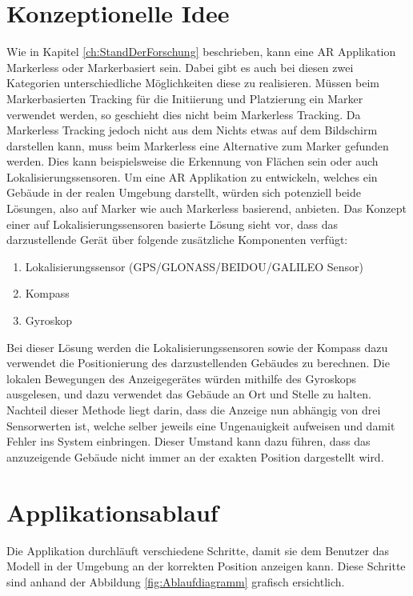 \documentclass[a4paper]{scrreprt}
\begin{document}
\section{Konzeptionelle Idee}
Wie in Kapitel \ref{ch:StandDerForschung} beschrieben, kann eine AR Applikation Markerless oder Markerbasiert sein. Dabei gibt es auch bei diesen zwei Kategorien unterschiedliche Möglichkeiten diese zu realisieren. Müssen beim Markerbasierten Tracking für die Initiierung und Platzierung ein Marker verwendet werden, so geschieht dies nicht beim Markerless Tracking. Da Markerless Tracking jedoch nicht aus dem Nichts etwas auf dem Bildschirm darstellen kann, muss beim Markerless eine Alternative zum Marker gefunden werden. Dies kann beispielsweise die Erkennung von Flächen sein \parencite{GoogleARCore2018} oder auch Lokalisierungssensoren.
Um eine AR Applikation zu entwickeln, welches ein Gebäude in der realen Umgebung darstellt, würden sich potenziell beide Lösungen, also auf Marker wie auch Markerless basierend, anbieten.
\bigbreak
Das Konzept einer auf Lokalisierungssensoren basierte Lösung sieht vor, dass das darzustellende Gerät über folgende zusätzliche Komponenten verfügt: 
\begin{enumerate}
	\item Lokalisierungssensor (GPS/GLONASS/BEIDOU/GALILEO Sensor)
	\item Kompass
	\item Gyroskop
\end{enumerate}

Bei dieser Lösung werden die Lokalisierungssensoren sowie der Kompass dazu verwendet die Positionierung des darzustellenden Gebäudes zu berechnen. Die lokalen Bewegungen des Anzeigegerätes würden mithilfe des Gyroskops ausgelesen, und dazu verwendet das Gebäude an Ort und Stelle zu halten.
Nachteil dieser Methode liegt darin, dass die Anzeige nun abhängig von drei Sensorwerten ist, welche selber jeweils eine Ungenauigkeit aufweisen und damit Fehler ins System einbringen. Dieser Umstand kann dazu führen, dass das anzuzeigende Gebäude nicht immer an der exakten Position dargestellt wird.

\section{Applikationsablauf}
Die Applikation durchläuft verschiedene Schritte, damit sie dem Benutzer das Modell in der Umgebung an der korrekten Position anzeigen kann. Diese Schritte sind anhand der Abbildung  \ref{fig:Ablaufdiagramm} grafisch ersichtlich.
\end{document}
